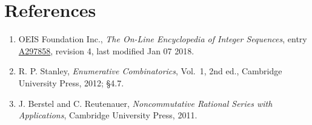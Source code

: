 \documentclass[11pt]{article}
\theoremstyle{definition}
\begin{document}
\section{References}

\begin{enumerate}

\item OEIS Foundation Inc., \emph{The On-Line Encyclopedia of Integer Sequences}, entry \href{https://oeis.org/A297858}{A297858}, revision 4, last modified Jan 07 2018.

\item R. P. Stanley, \emph{Enumerative Combinatorics}, Vol.~1, 2nd ed., Cambridge University Press, 2012; \S4.7.

\item J. Berstel and C. Reutenauer, \emph{Noncommutative Rational Series with Applications}, Cambridge University Press, 2011.

\end{enumerate}
\end{document}
